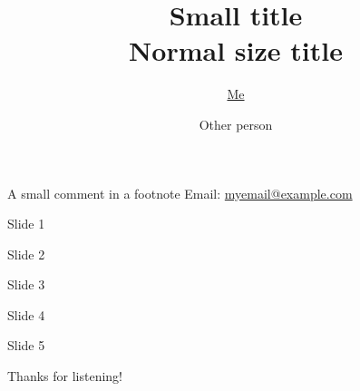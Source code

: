 \documentclass[14pt,aspectratio=169]{beamer}
\title{\small{Small title}\\
\vspace{0.3cm}
\normalsize{Normal size title}
}
\author{\underline{Me} \inst{1} \and Other person \inst{2}}
\institute[shortinst]{\inst{1} My Institute \samelineand \inst{2} Another Institute}
\def\\{}%
\newcommand{\beginbackup}{
	\newcounter{framenumbervorappendix}
	\setcounter{framenumbervorappendix}{\value{framenumber}}
}
\begin{document}
{
  \begin{frame}
    \titlepage
    {\centering\footnotesize A small comment in a footnote}\\
    {\tiny
    Email: {\color{blue} \href{mailto:myemail@example.com}{myemail@example.com}}}
  \end{frame}
}

\begin{frame}{Slide 1}
\centering
\end{frame}

\begin{frame}{Slide 2}
\centering
\end{frame}

\begin{frame}{Slide 3}
\centering
\end{frame}

\begin{frame}{Slide 4}
\centering
\end{frame}

\begin{frame}{Slide 5}
\centering
\end{frame}

\begin{frame}
\centering
\Large{Thanks for listening!}
\end{frame}


%	
%		

\end{document}
